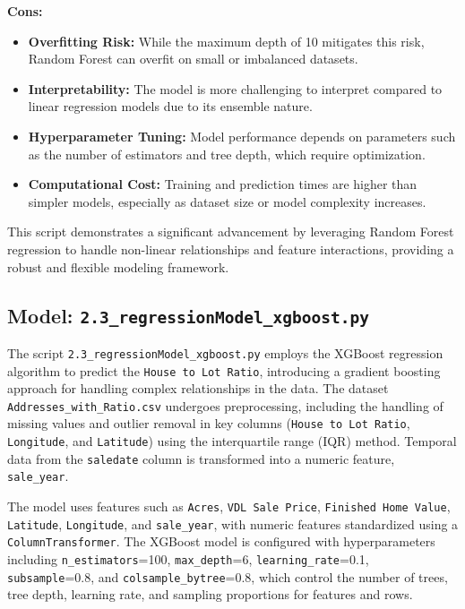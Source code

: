 \textbf{Cons:}
\begin{itemize}
    \item \textbf{Overfitting Risk:} While the maximum depth of 10 mitigates this risk, Random Forest can overfit on small or imbalanced datasets.
    \item \textbf{Interpretability:} The model is more challenging to interpret compared to linear regression models due to its ensemble nature.
    \item \textbf{Hyperparameter Tuning:} Model performance depends on parameters such as the number of estimators and tree depth, which require optimization.
    \item \textbf{Computational Cost:} Training and prediction times are higher than simpler models, especially as dataset size or model complexity increases.
\end{itemize}

This script demonstrates a significant advancement by leveraging Random Forest regression to handle non-linear relationships and feature interactions, providing a robust and flexible modeling framework. \\

\hrulefill

\subsection{Model: \texttt{2.3\_regressionModel\_xgboost.py}}

The script \texttt{2.3\_regressionModel\_xgboost.py} employs the XGBoost regression algorithm to predict the \texttt{House to Lot Ratio}, introducing a gradient boosting approach for handling complex relationships in the data. The dataset \texttt{Addresses\_with\_Ratio.csv} undergoes preprocessing, including the handling of missing values and outlier removal in key columns (\texttt{House to Lot Ratio}, \texttt{Longitude}, and \texttt{Latitude}) using the interquartile range (IQR) method. Temporal data from the \texttt{saledate} column is transformed into a numeric feature, \texttt{sale\_year}.

The model uses features such as \texttt{Acres}, \texttt{VDL Sale Price}, \texttt{Finished Home Value}, \texttt{Latitude}, \texttt{Longitude}, and \texttt{sale\_year}, with numeric features standardized using a \texttt{ColumnTransformer}. The XGBoost model is configured with hyperparameters including \texttt{n\_estimators}=100, \texttt{max\_depth}=6, \texttt{learning\_rate}=0.1, \texttt{subsample}=0.8, and \texttt{colsample\_bytree}=0.8, which control the number of trees, tree depth, learning rate, and sampling proportions for features and rows.

